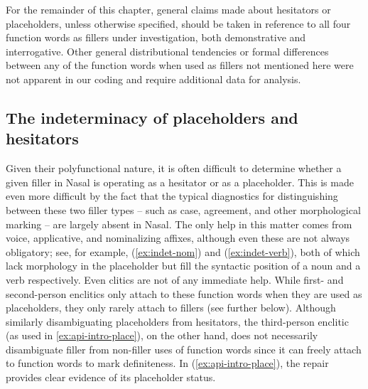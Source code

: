 \documentclass[output=paper,colorlinks,citecolor=brown
\ChapterDOI{10.5281/zenodo.15697585}
]{langscibook}
\begin{document}
For the remainder of this chapter, general claims made about hesitators or placeholders, unless otherwise specified, should be taken in reference to all four function words as fillers under investigation, both demonstrative and interrogative. Other general distributional tendencies or formal differences between any of the function words when used as fillers not mentioned here were not apparent in our coding and require additional data for analysis.

\subsection{The indeterminacy of placeholders and hesitators}
Given their polyfunctional nature, it is often difficult to determine whether a given filler in Nasal is operating as a hesitator or as a placeholder. This is made even more difficult by the fact that the typical diagnostics for distinguishing between these two filler types -- such as case, agreement, and other morphological marking -- are largely absent in Nasal. The only help in this matter comes from voice, applicative, and nominalizing affixes, although even these are not always obligatory; see, for example, (\ref{ex:indet-nom}) and (\ref{ex:indet-verb}), both of which lack morphology in the placeholder but fill the syntactic position of a noun and a verb respectively. Even clitics are not of any immediate help. While first- and second-person enclitics only attach to these function words when they are used as placeholders, they only rarely attach to fillers (see  further below). Although similarly disambiguating placeholders from hesitators, the third-person enclitic (as used in \ref{ex:api-intro-place}), on the other hand, does not necessarily disambiguate filler from non-filler uses of function words since it can freely attach to function words to mark definiteness. In (\ref{ex:api-intro-place}), the repair provides clear evidence of its placeholder status.
\end{document}
